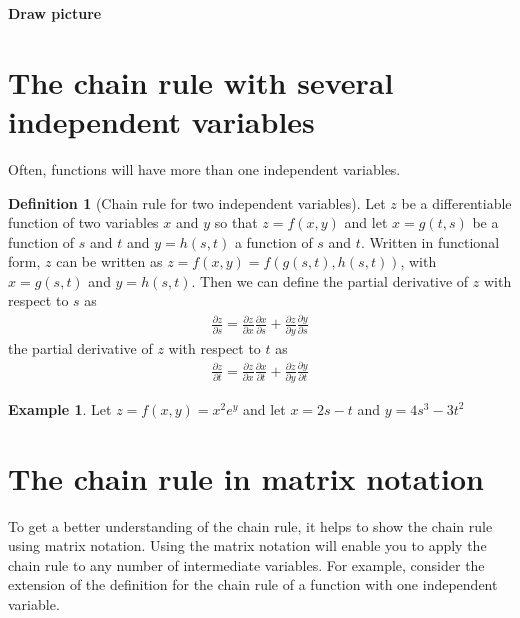\documentclass[
]{book}
\theoremstyle{definition}
\newtheorem{definition}{Definition}[chapter]
\theoremstyle{definition}
\newtheorem{example}{Example}[chapter]
\theoremstyle{definition}
\theoremstyle{remark}
\begin{document}
\textbf{Draw picture}

\hypertarget{the-chain-rule-with-several-independent-variables}{%
\section{The chain rule with several independent variables}\label{the-chain-rule-with-several-independent-variables}}

Often, functions will have more than one independent variables.

\begin{definition}[Chain rule for two independent variables]
\protect\hypertarget{def:unnamed-chunk-282}{}{\label{def:unnamed-chunk-282} {} }Let \(z\) be a differentiable function of two variables \(x\) and \(y\) so that \(z = f(x, y)\) and let \(x=g(t, s)\) be a function of \(s\) and \(t\) and \(y=h(s, t)\) a function of \(s\) and \(t\). Written in functional form, \(z\) can be written as \(z = f(x, y) = f(g(s, t), h(s, t))\), with \(x=g(s, t)\) and \(y=h(s, t)\). Then we can define the partial derivative of \(z\) with respect to \(s\) as
\[
\begin{aligned}
\frac{\partial z}{\partial s} = \frac{\partial z}{ \partial x}\frac{\partial x}{\partial s} + \frac{\partial z}{\partial y}\frac{\partial y}{\partial s}
\end{aligned}
\]
the partial derivative of \(z\) with respect to \(t\) as
\[
\begin{aligned}
\frac{\partial z}{\partial t} = \frac{\partial z}{ \partial x}\frac{\partial x}{\partial t} + \frac{\partial z}{\partial y}\frac{\partial y}{\partial t}
\end{aligned}
\]
\end{definition}

\begin{example}
\protect\hypertarget{exm:unnamed-chunk-283}{}{\label{exm:unnamed-chunk-283} }Let \(z = f(x, y) = x^2 e^y\) and let \(x = 2s - t\) and \(y = 4s^3-3t^2\)
\end{example}

\hypertarget{the-chain-rule-in-matrix-notation}{%
\section{The chain rule in matrix notation}\label{the-chain-rule-in-matrix-notation}}

To get a better understanding of the chain rule, it helps to show the chain rule using matrix notation. Using the matrix notation will enable you to apply the chain rule to any number of intermediate variables. For example, consider the extension of the definition for the chain rule of a function with one independent variable.
\end{document}
